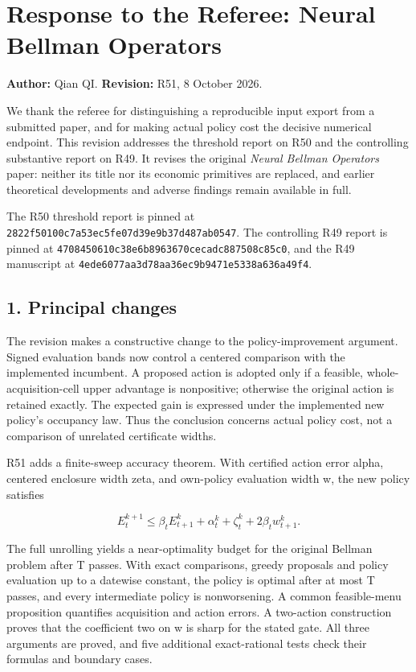 \hypertarget{response-to-the-referee-neural-bellman-operators}{%
\section{Response to the Referee: Neural Bellman
Operators}\label{response-to-the-referee-neural-bellman-operators}}

\textbf{Author:} Qian QI. \textbf{Revision:} R51, 8 October 2026.

We thank the referee for distinguishing a reproducible input export from
a submitted paper, and for making actual policy cost the decisive
numerical endpoint. This revision addresses the threshold report on R50
and the controlling substantive report on R49. It revises the original
\emph{Neural Bellman Operators} paper: neither its title nor its
economic primitives are replaced, and earlier theoretical developments
and adverse findings remain available in full.

The R50 threshold report is pinned at
\texttt{2822f50100c7a53ec5fe07d39e9b37d487ab0547}. The controlling R49
report is pinned at \texttt{4708450610c38e6b8963670cecadc887508c85c0},
and the R49 manuscript at
\texttt{4ede6077aa3d78aa36ec9b9471e5338a636a49f4}.

\hypertarget{principal-changes}{%
\subsection{1. Principal changes}\label{principal-changes}}

The revision makes a constructive change to the policy-improvement
argument. Signed evaluation bands now control a centered comparison with
the implemented incumbent. A proposed action is adopted only if a
feasible, whole-acquisition-cell upper advantage is nonpositive;
otherwise the original action is retained exactly. The expected gain is
expressed under the implemented new policy's occupancy law. Thus the
conclusion concerns actual policy cost, not a comparison of unrelated
certificate widths.

R51 adds a finite-sweep accuracy theorem. With certified action error
alpha, centered enclosure width zeta, and own-policy evaluation width w,
the new policy satisfies

\[
 E_t^{k+1}\leq\beta_t E_{t+1}^k+
 \alpha_t^k+\zeta_t^k+2\beta_tw_{t+1}^k.
\]

The full unrolling yields a near-optimality budget for the original
Bellman problem after T passes. With exact comparisons, greedy proposals
and policy evaluation up to a datewise constant, the policy is optimal
after at most T passes, and every intermediate policy is nonworsening. A
common feasible-menu proposition quantifies acquisition and action
errors. A two-action construction proves that the coefficient two on w
is sharp for the stated gate. All three arguments are proved, and five
additional exact-rational tests check their formulas and boundary cases.

